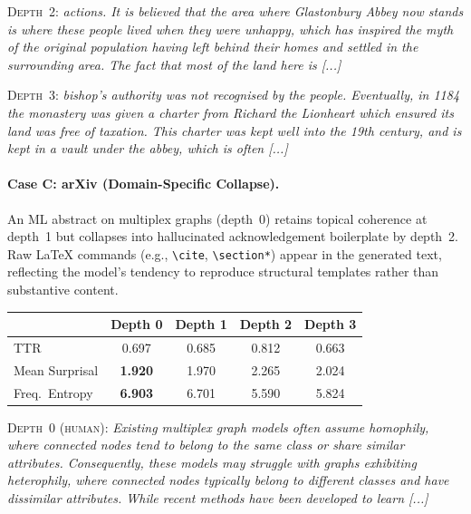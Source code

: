 \noindent\textsc{Depth~2:} {\small\itshape actions. It is believed that the area where Glastonbury Abbey now stands is where these people lived when they were unhappy, which has inspired the myth of the original population having left behind their homes and settled in the surrounding area. The fact that most of the land here is [...]}
\smallskip

\noindent\textsc{Depth~3:} {\small\itshape bishop's authority was not recognised by the people. Eventually, in 1184 the monastery was given a charter from Richard the Lionheart which ensured its land was free of taxation. This charter was kept well into the 19th century, and is kept in a vault under the abbey, which is often [...]}

\medskip

\paragraph{Case C: arXiv (Domain-Specific Collapse).}
An ML abstract on multiplex graphs (depth~0) retains topical coherence at depth~1 but collapses into hallucinated acknowledgement boilerplate by depth~2. Raw \LaTeX{} commands (e.g., \verb|\cite|, \verb|\section*|) appear in the generated text, reflecting the model's tendency to reproduce structural templates rather than substantive content.

\begin{center}
{\footnotesize
\begin{tabular}{lcccc}
\toprule
& \textbf{Depth 0} & \textbf{Depth 1} & \textbf{Depth 2} & \textbf{Depth 3} \\
\midrule
TTR & 0.697 & 0.685 & 0.812 & 0.663 \\
Mean Surprisal & \textbf{1.920} & 1.970 & 2.265 & 2.024 \\
Freq.\ Entropy & \textbf{6.903} & 6.701 & 5.590 & 5.824 \\
\bottomrule
\end{tabular}}
\end{center}

\noindent\textsc{Depth~0 (human):} {\small\itshape Existing multiplex graph models often assume homophily, where connected nodes tend to belong to the same class or share similar attributes. Consequently, these models may struggle with graphs exhibiting heterophily, where connected nodes typically belong to different classes and have dissimilar attributes. While recent methods have been developed to learn [...]}
\smallskip

